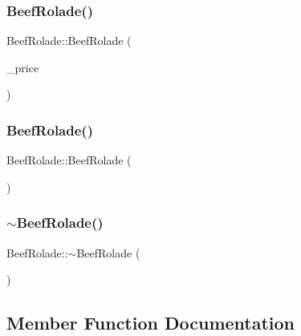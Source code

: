\subsubsection{\texorpdfstring{BeefRolade()}{BeefRolade()}\hspace{0.1cm}{\footnotesize\ttfamily [1/2]}}
{\footnotesize\ttfamily Beef\+Rolade\+::\+Beef\+Rolade (\begin{DoxyParamCaption}\item[{int}]{\+\_\+price }\end{DoxyParamCaption})}

\mbox{\label{classBeefRolade_aa146791a1024384ebb59a8f843e4bcdd}} 
\subsubsection{\texorpdfstring{BeefRolade()}{BeefRolade()}\hspace{0.1cm}{\footnotesize\ttfamily [2/2]}}
{\footnotesize\ttfamily Beef\+Rolade\+::\+Beef\+Rolade (\begin{DoxyParamCaption}\item[{const \mbox{\hyperlink{classBeefRolade}{Beef\+Rolade}} \&}]{ }\end{DoxyParamCaption})}

\mbox{\label{classBeefRolade_a9c867e5e6d2f50348955ff59b1f58adc}} 
\subsubsection{\texorpdfstring{$\sim$BeefRolade()}{~BeefRolade()}}
{\footnotesize\ttfamily Beef\+Rolade\+::$\sim$\+Beef\+Rolade (\begin{DoxyParamCaption}{ }\end{DoxyParamCaption})}



\subsection{Member Function Documentation}
\mbox{\label{classBeefRolade_a8325fd949e7c620eedf4d26451b47fa9}} 
